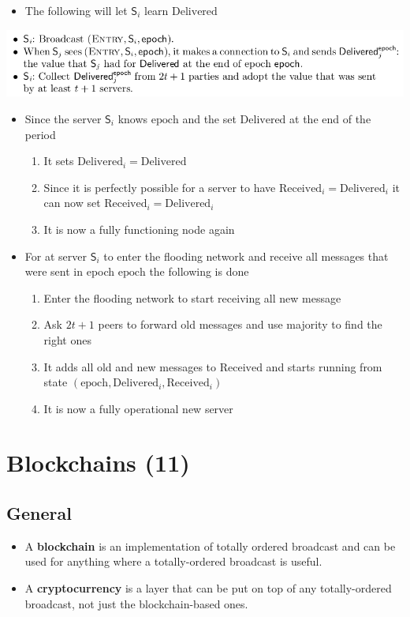 \documentclass[11pt]{article}
\begin{document}
\begin{itemize}
\item The following will let \(\mathsf S_i\) learn \(\text{Delivered}\)
\end{itemize}
\begin{center}
\includegraphics[width=.9\linewidth]{State Machine Replication (10)/screenshot_2018-10-21_17-08-40.png}
\end{center}
\begin{itemize}
\item Since the server \(\mathsf S_i\) knows \(\text{epoch}\) and the set \(\text{Delivered}\) at the end of the period
\begin{enumerate}
\item It sets \(\text{Delivered}_i=\text{Delivered}\)
\item Since it is perfectly possible for a server to have \(\text{Received}_i = \text{Delivered}_i\) it can now set \(\text{Received}_i = \text{Delivered}_i\)
\item It is now a fully functioning node again
\end{enumerate}

\item For at server \(\mathsf S_i\) to enter the flooding network and receive all messages that were sent in epoch \(\text{epoch}\) the following is done
\begin{enumerate}
\item Enter the flooding network to start receiving all new message
\item Ask \(2t+1\) peers to forward old messages and use majority to find the right ones
\item It adds all old and new messages to \(\text{Received}\) and starts running from state \((\text{epoch}, \text{Delivered}_i, \text{Received}_i)\)
\item It is now a fully operational new server
\end{enumerate}
\end{itemize}

\section{Blockchains (11)}
\label{sec:org01aac00}
\subsection{General}
\label{sec:org4430162}
\begin{itemize}
\item A \textbf{blockchain} is an implementation of totally ordered broadcast and can be used for anything where a totally-ordered broadcast is useful.
\item A \textbf{cryptocurrency} is a layer that can be put on top of any totally-ordered broadcast, not just the blockchain-based ones.
\end{itemize}
\end{document}
